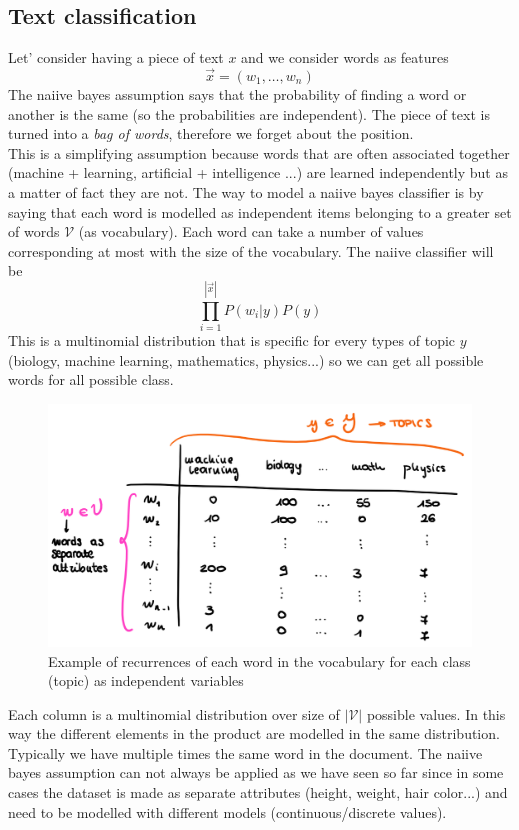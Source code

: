     \subsection{Text classification}
    Let' consider having a piece of text $x$ and we consider words as features
    $$\Vec{x} = (w_1, \dots, w_n)$$
    The naiive bayes assumption says that the probability of finding a word or another is the same (so the probabilities are independent). The piece of text is turned into a \textit{bag of words}, therefore we forget about the position.\\
    This is a simplifying assumption because words that are often associated together (machine + learning, artificial + intelligence ...) are learned independently but as a matter of fact they are not.
    The way to model a naiive bayes classifier is by saying that each word is modelled as independent items belonging to a greater set of words $\mathcal{V}$ (as vocabulary). 
    Each word can take a number of values corresponding at most with the size of the vocabulary.
    The naiive classifier will be
    $$\prod_{i=1}^{|\Vec{x}|} P(w_i|y)P(y)$$
    This is a multinomial distribution that is specific for every types of topic $y$ (biology, machine learning, mathematics, physics...) so we can get all possible words for all possible class. 
    \begin{figure}[ht]
        \centering
        \includegraphics[scale=0.4]{images/text classification.png}
        \caption{Example of recurrences of each word in the vocabulary for each class (topic) as independent variables}
        \label{fig:naiive_text}
    \end{figure}
    Each column is a multinomial distribution over size of $|\mathcal{V}|$ possible values. In this way the different elements in the product are modelled in the same distribution. Typically we have multiple times the same word in the document.
    The naiive bayes assumption can not always be applied as we have seen so far since in some cases the dataset is made as separate attributes (height, weight, hair color...) and need to be modelled with different models (continuous/discrete values).